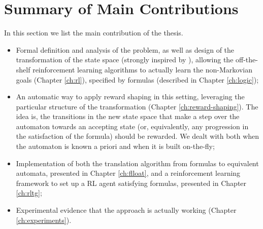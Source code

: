 \section{Summary of Main Contributions}
In this section we list the main contribution of the thesis.
\begin{itemize}
	\item Formal definition and analysis of the problem, as well as design of the transformation of the state space (strongly inspired by \cite{AAAI1817342}), allowing the off-the-shelf reinforcement learning algorithms to actually learn the non-Markovian goals (Chapter \ref{ch:rl}), specified by \LLf formulas (described in Chapter \ref{ch:logic});
	\item An automatic way to apply reward shaping in this setting, leveraging the particular structure of the transformation (Chapter \ref{ch:reward-shaping}). The idea is, the transitions in the new state space that make a step over the automaton towards an accepting state (or, equivalently, any progression in the satisfaction of the formula) should be rewarded. We dealt with both when the automaton is known a priori and when it is built on-the-fly;
	\item Implementation of both the translation algorithm from \LLf formulas to equivalent automata, presented in Chapter \ref{ch:flloat}, and a reinforcement learning framework to set up a RL agent satisfying \LLf formulas, presented in Chapter \ref{ch:rltg};
	\item Experimental evidence that the approach is actually working (Chapter \ref{ch:experiments}).
\end{itemize}

